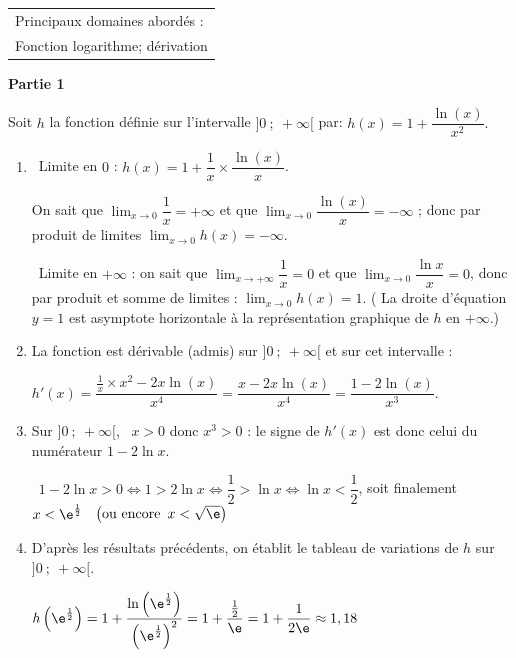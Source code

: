 \smallskip

\begin{tabular}{|l|}\hline
Principaux domaines abordés :\\
Fonction logarithme; dérivation\\ \hline
\end{tabular}

\begin{center}\textbf{Partie 1}\end{center}

Soit $h$ la fonction définie sur l'intervalle $]0~;~ +\infty[$ par:
$h(x) = 1 + \dfrac{\ln (x)}{x^2}.$



\medskip

\begin{enumerate}
\item 
\starredbullet~Limite en $0$ : $h(x) = 1 + \dfrac{1}{x} \times \dfrac{\ln (x)}{x}$.

On sait que $\displaystyle\lim_{x \to 0} \dfrac{1}{x} = + \infty$ et que $\displaystyle\lim_{x \to 0} \dfrac{\ln (x)}{x} = - \infty$ ; donc par produit de limites $\displaystyle\lim_{x \to 0} h(x) = - \infty$.

\starredbullet~Limite en $+ \infty$ : on sait que $\displaystyle\lim_{x \to + \infty} \dfrac{1}{x} = 0$ et que $\displaystyle\lim_{x \to 0} \dfrac{\ln x}{x} = 0$, donc par produit et somme de limites : $\displaystyle\lim_{x \to 0} h(x) = 1$. ( La droite d'équation $y = 1$ est asymptote horizontale à la représentation graphique de $h$ en $+\infty$.)
  
\item 
La fonction est dérivable (admis) sur $]0~;~ +\infty[$ et sur cet intervalle :

$h'(x) = \dfrac{\frac{1}{x} \times x^2 - 2x\ln (x)}{x^4} = \dfrac{x - 2x\ln (x)}{x^4}  = \dfrac{1 - 2\ln (x)}{x^3}$.
\item 
Sur $]0~;~ +\infty[$, \, $x > 0$ donc $x^3 > 0$ : le signe de $h'(x)$ est donc celui du numérateur $1 - 2\ln x$.

\starredbullet~$1 - 2\ln x > 0 \iff 1 > 2\ln x \iff \dfrac{1}{2} > \ln x \iff  \ln x < \dfrac{1}{2}$, soit finalement $x < \e^{\frac{1}{2}}$ \, $\left(\text{ou encore }\, x < \sqrt{\e} \right)$

\item 
D'après les résultats précédents, on établit le tableau de variations de $h$ sur $]0~;~+\infty[$.

$h\left ( \e^{\frac{1}{2}}\right ) = 1+\dfrac{\ln\left (\e^{\frac{1}{2}}\right )}{\left (\e^{\frac{1}{2}}\right )^2}= 1+\dfrac{\frac{1}{2}}{\e}= 1+\dfrac{1}{2\e}\approx 1,18$


\end{enumerate}
